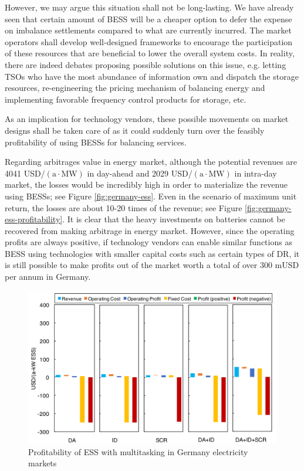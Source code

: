 However, we may argue this situation shall not be long-lasting. We have already seen that certain amount of BESS will be a cheaper option to defer the expense on imbalance settlements compared to what are currently incurred. The market operators shall develop well-designed frameworks to encourage the participation of these resources that are beneficial to lower the overall system costs. In reality, there are indeed debates proposing possible solutions on this issue, e.g. letting TSOs who have the most abundance of information own and dispatch the storage resources\cite{He2012}, re-engineering the pricing mechanism of balancing energy\cite{Wartsila2014} and implementing favorable frequency control products for storage\cite{Megel2017}, etc.

As an implication for technology vendors, these possible movements on market designs shall be taken care of as it could suddenly turn over the feasibly profitability of using BESSs for balancing services.

Regarding arbitrages value in energy market, although the potential revenues are \num{4041} USD/$(\text{a} \cdot \text{MW})$ in day-ahead and \num{2029} USD/$(\text{a} \cdot \text{MW})$ in intra-day market, the losses would be incredibly high in order to materialize the revenue using BESSs; see Figure \ref{fig:germany-ess}. Even in the scenario of maximum unit return, the losses are about 10-20 times of the revenue; see Figure \ref{fig:germany-ess-profitability}. It is clear that the heavy investments on batteries cannot be recovered from making arbitrage in energy market. However, since the operating profits are always positive, if technology vendors can enable similar functions as BESS using technologies with smaller capital costs such as certain types of DR, it is still possible to make profits out of the market worth a total of over 300 mUSD per annum in Germany.

\begin{figure}[h!]
	\centering
	\includegraphics[width=0.95\linewidth]{Figures/Germany_ESS_profitability_multitasking}
	\caption{Profitability of ESS with multitasking in Germany electricity markets}
	\label{fig:germany-ess-multitasking-profitability}
\end{figure}

